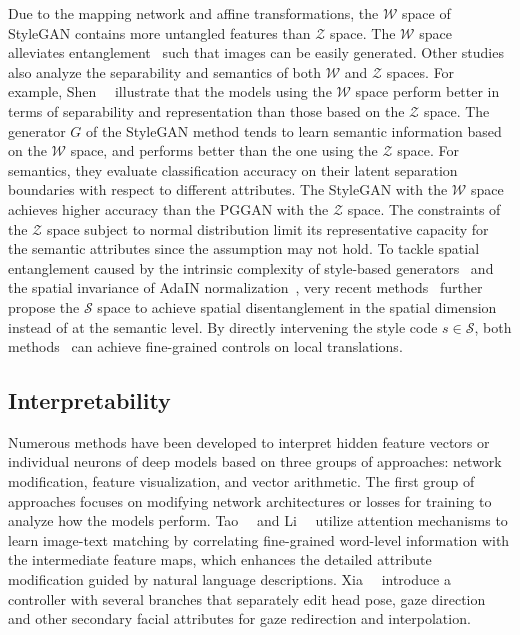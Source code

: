 Due to the mapping network and affine transformations, the $\mathcal{W}$ space of StyleGAN contains more untangled features than $\mathcal{Z}$ space. 
The $\mathcal{W}$ space alleviates entanglement~\cite{karras2019style} such that images can be easily generated. 
Other studies also analyze the separability and semantics of both $\mathcal{W}$ and $\mathcal{Z}$ spaces.
For example, Shen~\etal~\cite{shen2020interpreting} illustrate that the models using the $\mathcal{W}$ space perform better in terms of separability and representation than those based on the $\mathcal{Z}$ space.
The generator $G$ of the StyleGAN method tends to learn semantic information based on the $\mathcal{W}$ space, and performs better than the one using the $\mathcal{Z}$ space.
For semantics, they evaluate classification accuracy on their latent separation boundaries with respect to different attributes.
The StyleGAN with the $\mathcal{W}$ space achieves higher accuracy than the PGGAN with the $\mathcal{Z}$ space.  
The constraints of the $\mathcal{Z}$ space subject to normal distribution limit its representative capacity for the semantic attributes since the assumption may not hold. 
To tackle spatial entanglement caused by the intrinsic complexity of style-based generators~\cite{karras2019style} and the spatial invariance of AdaIN normalization~\cite{huang2017adain}, very recent methods~\cite{liu2020style,wu2020stylespace} further propose the $\mathcal{S}$ space to achieve spatial disentanglement in the spatial dimension instead of at the semantic level. 
By directly intervening the style code $s \in \mathcal{S}$, both methods~\cite{liu2020style,wu2020stylespace} can achieve fine-grained controls on local translations.

\subsection{Interpretability}
Numerous methods have been developed to interpret hidden feature vectors or individual neurons of deep models based on three groups of approaches: network modification, feature visualization, and vector arithmetic.
The first group of approaches focuses on modifying network architectures or losses for training to analyze how the models perform. 
Tao~\etal~\cite{Tao18attngan} and Li~\etal~\cite{li2019control,li2020manigan} utilize attention mechanisms to learn image-text matching by correlating fine-grained word-level information with the intermediate feature maps, which enhances the detailed attribute modification guided by natural language descriptions.
Xia~\etal~\cite{xia2020gaze} introduce a controller with several branches that separately edit head pose, gaze direction and other secondary facial attributes for gaze redirection and interpolation.

